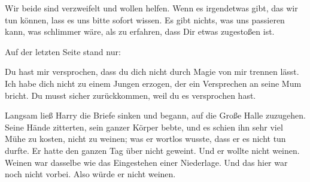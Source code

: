 \begin{writtenNote}
Wir beide sind verzweifelt und wollen helfen. Wenn es irgendetwas gibt, das wir tun können, lass es uns bitte sofort wissen. Es gibt nichts, was uns passieren kann, was schlimmer wäre, als zu erfahren, dass Dir etwas zugestoßen ist.

\end{writtenNote}

Auf der letzten Seite stand nur:

\begin{writtenNote}
Du hast mir versprochen, dass du dich nicht durch Magie von mir trennen lässt. Ich habe dich nicht zu einem Jungen erzogen, der ein Versprechen an seine Mum bricht. Du musst sicher zurückkommen, weil du es versprochen hast.

\end{writtenNote}

Langsam ließ Harry die Briefe sinken und begann, auf die Große Halle zuzugehen. Seine Hände zitterten, sein ganzer Körper bebte, und es schien ihn sehr viel Mühe zu kosten, nicht zu weinen; was er wortlos wusste, dass er es nicht tun durfte. Er hatte den ganzen Tag über nicht geweint. Und er wollte nicht weinen. Weinen war dasselbe wie das Eingestehen einer Niederlage. Und das hier war noch nicht vorbei. Also würde er nicht weinen.

\later


